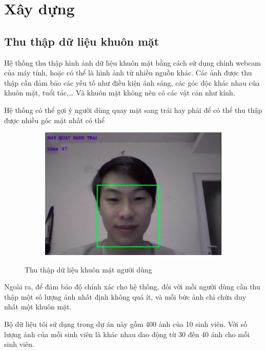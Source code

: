 \newpage
\section{Xây dựng}

\subsection{Thu thập dữ liệu khuôn mặt}
Hệ thống thu thập hình ảnh dữ liệu khuôn mặt bằng cách sử dụng chính webcam
của máy tính, hoặc có thể là hình ảnh từ nhiều nguồn khác.
Các ảnh được thu thập cần đảm bảo các yếu tố như điều kiện ánh sáng,
các góc độc khác nhau của khuôn mặt, tuổi tác,…
Và khuôn mặt không nên có các vật cản như kính.

Hệ thống có thể gợi ý người dùng quay mặt sang trái hay phải để có thể thu thập được
nhiều góc mặt nhất có thể

\begin{figure}
    \begin{subfigure}{0.6\textwidth}
        \includegraphics[width=1\linewidth]{Chapters/items/chap3_2.jpg}
        \label{fig:chap3_2}
    \end{subfigure}
    \caption{Thu thập dữ liệu khuôn mặt người dùng}
\end{figure}

Ngoài ra, để đảm bảo độ chính xác cho hệ thống, đối với mỗi người dùng
cần thu thập một số lượng ảnh nhất định không quá ít, và mỗi bức ảnh chỉ
chứa duy nhất một khuôn mặt.

Bộ dữ liệu tôi sử dụng trong dự án này gồm 400 ảnh của 10 sinh viên.
Với số lượng ảnh của mỗi sinh viên là khác nhau dao động từ 30 đến 40
ảnh cho mỗi sinh viên.
\newpage
